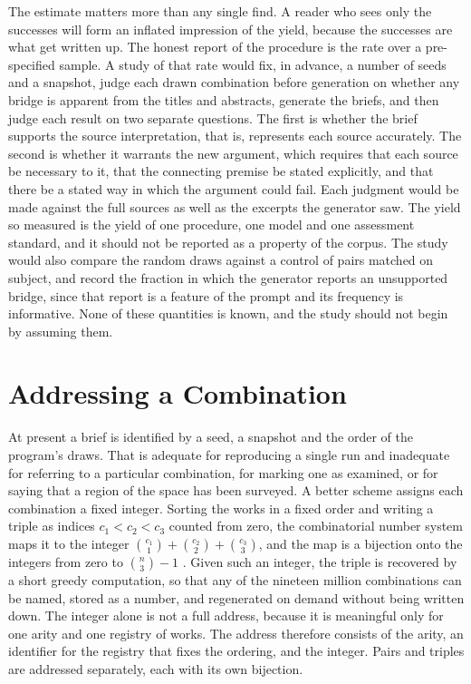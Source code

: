 \documentclass[11pt]{article}
\begin{document}
The estimate matters more than any single find. A reader who sees only the successes will form an inflated impression of the yield, because the successes are what get written up. The honest report of the procedure is the rate over a pre-specified sample. A study of that rate would fix, in advance, a number of seeds and a snapshot, judge each drawn combination before generation on whether any bridge is apparent from the titles and abstracts, generate the briefs, and then judge each result on two separate questions. The first is whether the brief supports the source interpretation, that is, represents each source accurately. The second is whether it warrants the new argument, which requires that each source be necessary to it, that the connecting premise be stated explicitly, and that there be a stated way in which the argument could fail. Each judgment would be made against the full sources as well as the excerpts the generator saw. The yield so measured is the yield of one procedure, one model and one assessment standard, and it should not be reported as a property of the corpus. The study would also compare the random draws against a control of pairs matched on subject, and record the fraction in which the generator reports an unsupported bridge, since that report is a feature of the prompt and its frequency is informative. None of these quantities is known, and the study should not begin by assuming them.

\section{Addressing a Combination}

At present a brief is identified by a seed, a snapshot and the order of the program's draws. That is adequate for reproducing a single run and inadequate for referring to a particular combination, for marking one as examined, or for saying that a region of the space has been surveyed. A better scheme assigns each combination a fixed integer. Sorting the works in a fixed order and writing a triple as indices $c_1<c_2<c_3$ counted from zero, the combinatorial number system maps it to the integer $\binom{c_1}{1}+\binom{c_2}{2}+\binom{c_3}{3}$, and the map is a bijection onto the integers from zero to $\binom{n}{3}-1$ \cite{knuth2011}. Given such an integer, the triple is recovered by a short greedy computation, so that any of the nineteen million combinations can be named, stored as a number, and regenerated on demand without being written down. The integer alone is not a full address, because it is meaningful only for one arity and one registry of works. The address therefore consists of the arity, an identifier for the registry that fixes the ordering, and the integer. Pairs and triples are addressed separately, each with its own bijection.
\end{document}

